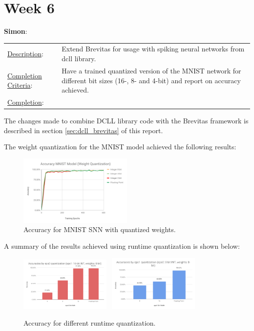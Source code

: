 \documentclass[parskip=true, 10pt]{scrartcl}
\begin{document}
\section*{Week 6}


\textsf{\textbf{Simon}}:

\begin{tabularx}{\textwidth}{p{3.5cm} p{10cm}}
\underline{Description}: & Extend Brevitas for usage with spiking neural networks from dcll library.\\

\underline{Completion Criteria}: & Have a trained quantized version of the MNIST network for different bit sizes (16-, 8- and 4-bit) and report on accuracy achieved.\\
\underline{Completion}:
\end{tabularx}

The changes made to combine DCLL library code with the Brevitas framework is described in section \ref{sec:dcll_brevitas} of this report.

The weight quantization for the MNIST model achieved the following results:
\begin{figure}[H]
    \centering
    \includegraphics[width=0.5\textwidth]{mnist_quantization.pdf}
    \caption{Accuracy for MNIST SNN with quantized weights.}
\end{figure}

A summary of the results achieved using runtime quantization is shown below:
\begin{figure}[H]
    \centering
    \includegraphics[width=0.4\textwidth]{eps0.pdf}~
    \includegraphics[width=0.4\textwidth]{eps1.pdf}
    \caption{Accuracy for different runtime quantization.}
\end{figure}
\end{document}
